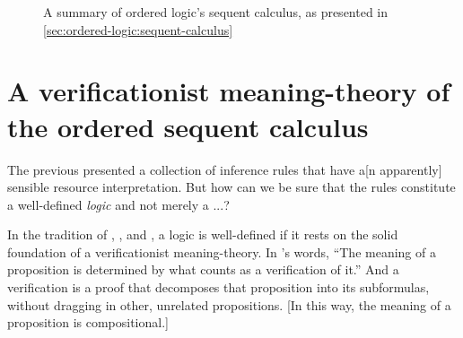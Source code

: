 \begin{figure}[tbp]
  \caption{A summary of  ordered logic's sequent calculus, as presented in \cref{sec:ordered-logic:sequent-calculus}}\label{fig:ordered-logic:sequent-calculus}
\end{figure}

\section{A verificationist meaning-theory of the ordered sequent calculus}\label{sec:ordered-logic:verifications}

The previous  presented a collection of inference rules that have a[n apparently] sensible resource interpretation.
But how can we be sure that the rules constitute a well-defined \emph{logic} and not merely a ...?

In the tradition of \citeauthor{Gentzen:MZ35}, \citeauthor{Dummett:WJ76}, and \citeauthor{Martin-Lof:Siena83}, a logic is well-defined if it rests on the solid foundation of a verificationist meaning-\-theory.\autocites{Gentzen:MZ35}{Dummett:WJ76}{Martin-Lof:Siena83}
In \citeauthor{Martin-Lof:Siena83}'s words, \enquote{The meaning of a proposition is determined by \textelp{} what counts as a verification of it.}
And a verification is a proof that decomposes that proposition into its subformulas, without dragging in other, unrelated propositions.
[In this way, the meaning of a proposition is compositional.]


